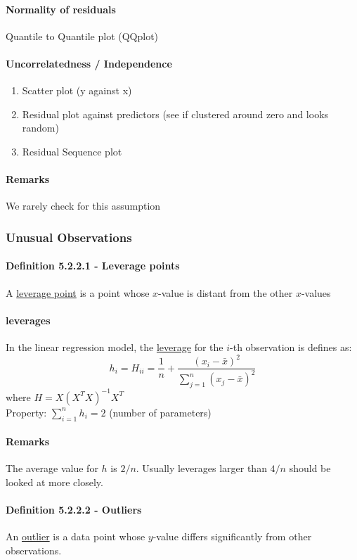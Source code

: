 \documentclass[11pt]{article}
\newcommand{\under}[1]{\underline{#1}}
\begin{document}
\paragraph{Normality of residuals}
Quantile to Quantile plot (QQplot)
\paragraph{Uncorrelatedness / Independence}
\begin{enumerate}
    \item Scatter plot (y against x)
    \item Residual plot against predictors (see if clustered around zero and looks random)
    \item Residual Sequence plot
\end{enumerate}
\paragraph{Remarks}
We rarely check for this assumption

\subsubsection{Unusual Observations}
\paragraph{Definition 5.2.2.1 - Leverage points}
A \under{leverage point} is a point whose $x$-value is distant from the other $x$-values
\paragraph{leverages}
In the linear regression model, the \under{leverage} for the $i$-th observation is defines as:
$$h_i = H_{ii} = \frac{1}{n}+\frac{(x_i-\bar{x})^2}{\sum_{j=1}^n(x_j-\bar{x})^2}$$
where $H = X(X^TX)^{-1}X^T$ \\
Property: $\sum_{i=1}^n h_i = 2$ (number of parameters)
\paragraph{Remarks}
The average value for $h$ is $2/n$. Usually leverages larger than $4/n$ should be looked at more closely.
\paragraph{Definition 5.2.2.2 - Outliers}
An \under{outlier} is a data point whose $y$-value differs significantly from other observations.
\end{document}
